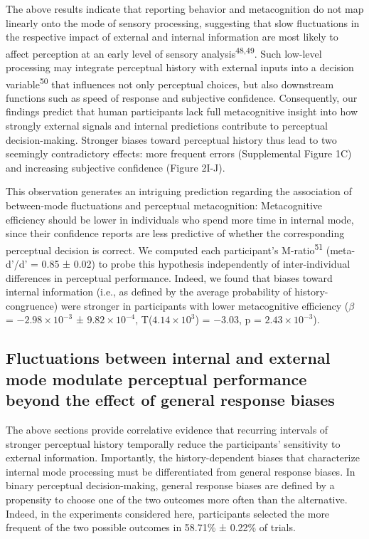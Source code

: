 \documentclass[
]{article}
\begin{document}
The above results indicate that reporting behavior and metacognition do
not map linearly onto the mode of sensory processing, suggesting that
slow fluctuations in the respective impact of external and internal
information are most likely to affect perception at an early level of
sensory analysis\textsuperscript{48,49}. Such low-level processing may
integrate perceptual history with external inputs into a decision
variable\textsuperscript{50} that influences not only perceptual
choices, but also downstream functions such as speed of response and
subjective confidence. Consequently, our findings predict that human
participants lack full metacognitive insight into how strongly external
signals and internal predictions contribute to perceptual
decision-making. Stronger biases toward perceptual history thus lead to
two seemingly contradictory effects: more frequent errors (Supplemental
Figure 1C) and increasing subjective confidence (Figure 2I-J).

This observation generates an intriguing prediction regarding the
association of between-mode fluctuations and perceptual metacognition:
Metacognitive efficiency should be lower in individuals who spend more
time in internal mode, since their confidence reports are less
predictive of whether the corresponding perceptual decision is correct.
We computed each participant's M-ratio\textsuperscript{51} (meta-d'/d' =
0.85 ± 0.02) to probe this hypothesis independently of inter-individual
differences in perceptual performance. Indeed, we found that biases
toward internal information (i.e., as defined by the average probability
of history-congruence) were stronger in participants with lower
metacognitive efficiency (\(\beta\) =
\(\ensuremath{-2.98\times 10^{-3}}\) ±
\(\ensuremath{9.82\times 10^{-4}}\),
T(\(\ensuremath{4.14\times 10^{3}}\)) = \(-3.03\), p =
\(\ensuremath{2.43\times 10^{-3}}\)).

\hypertarget{fluctuations-between-internal-and-external-mode-modulate-perceptual-performance-beyond-the-effect-of-general-response-biases}{%
\subsection{Fluctuations between internal and external mode modulate
perceptual performance beyond the effect of general response
biases}\label{fluctuations-between-internal-and-external-mode-modulate-perceptual-performance-beyond-the-effect-of-general-response-biases}}

The above sections provide correlative evidence that recurring intervals
of stronger perceptual history temporally reduce the participants'
sensitivity to external information. Importantly, the history-dependent
biases that characterize internal mode processing must be differentiated
from general response biases. In binary perceptual decision-making,
general response biases are defined by a propensity to choose one of the
two outcomes more often than the alternative. Indeed, in the experiments
considered here, participants selected the more frequent of the two
possible outcomes in 58.71\% ± 0.22\% of trials.
\end{document}
